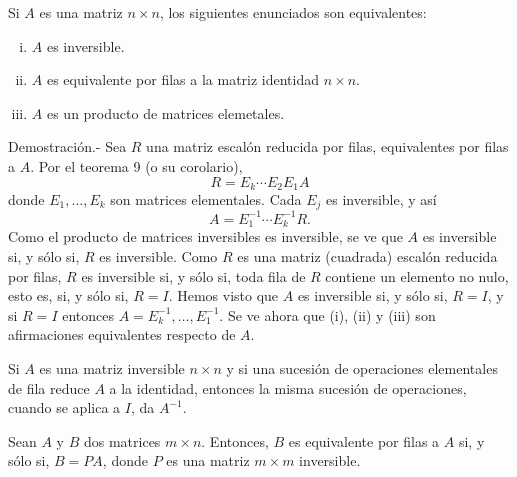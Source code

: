 \begin{teo}
    Si $A$ es una matriz $n\times n$, los siguientes enunciados son equivalentes:
    \begin{enumerate}[(i)]
	\item $A$ es inversible.
	\item $A$ es equivalente por filas a la matriz identidad $n\times n$.
	\item $A$ es un producto de matrices elemetales.\\
    \end{enumerate}
	Demostración.-\; Sea $R$ una matriz escalón reducida por filas, equivalentes por filas a $A$. Por el teorema 9 (o su corolario),
	$$R=E_k\cdots E_2E_1A$$
	donde $E_1,\ldots,E_k$ son matrices elementales. Cada $E_j$ es inversible, y así
	$$A=E_1^{-1}\cdots E_k^{-1}R.$$
	Como el producto de matrices inversibles es inversible, se ve que $A$ es inversible si, y sólo si, $R$ es inversible. Como $R$ es una matriz (cuadrada) escalón reducida por filas, $R$ es inversible si, y sólo si, toda fila de $R$ contiene un elemento no nulo, esto es, si, y sólo si, $R=I$. Hemos visto que $A$ es inversible si, y sólo si, $R=I$, y si $R=I$ entonces $A=E_k^{-1}, \ldots , E_1^{-1}$. Se ve ahora que (i), (ii) y (iii) son afirmaciones equivalentes respecto de $A$.
\end{teo}

\begin{cor}
    Si $A$ es una matriz inversible $n\times n$ y si una sucesión de operaciones elementales de fila reduce $A$ a la identidad, entonces la misma sucesión de operaciones, cuando se aplica a $I$, da $A^{-1}$. 
\end{cor}

\begin{cor}
    Sean $A$ y $B$ dos matrices $m\times n$. Entonces, $B$ es equivalente por filas a $A$ si, y sólo si, $B=PA$, donde $P$ es una matriz $m\times m$ inversible.
\end{cor}

